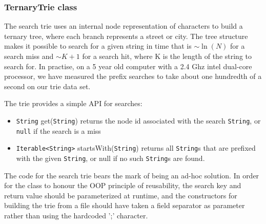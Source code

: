 \subsubsection{TernaryTrie class}
\label{sec:TernaryTrie class}
The search trie uses an internal node representation of characters to build a ternary tree, where each branch represents a street or city.
The tree structure makes it possible to search for a given string in time that is $\sim\ln(N)$ for a search miss and  $\sim K+1$ for a search hit, where K is the length of the string to search for.
In practise, on a 5 year old computer with a 2.4 Ghz intel dual-core processor, we have measured the prefix searches to take about one hundredth of a second on our trie data set.

The trie  provides a simple API for searches:
\begin{itemize}
	\item \texttt{String} get(\texttt{String}) returns the node id associated with the search \texttt{String}, or \texttt{null} if the search is a miss
	\item \texttt{Iterable<String>} startsWith(\texttt{String}) returns all \texttt{String}s that are prefixed with the given \texttt{String}, or null if no such \texttt{String}s are found.
\end{itemize}

The code for the search trie bears the mark of being an ad-hoc solution. In order for the class to honour the OOP principle of reusability, the search key and return value should be parameterized at runtime, and the constructors for building the trie from a file should have taken a field separator as parameter rather than using the hardcoded ';' character.

